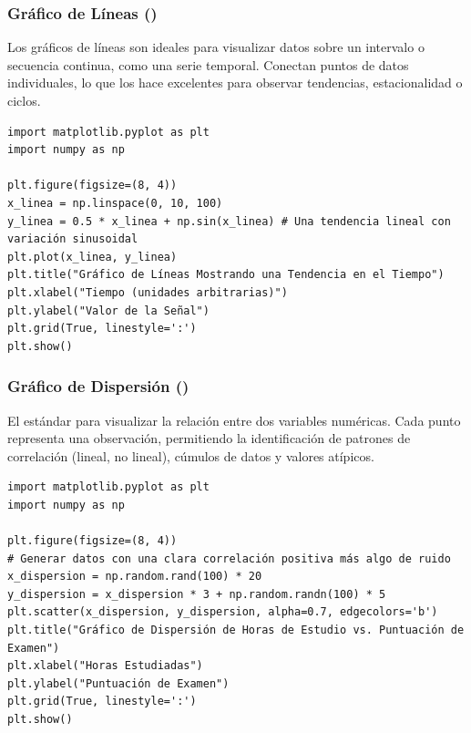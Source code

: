 \subsubsection*{Gráfico de Líneas ()}
Los gráficos de líneas son ideales para visualizar datos sobre un intervalo o secuencia continua, como una serie temporal. Conectan puntos de datos individuales, lo que los hace excelentes para observar tendencias, estacionalidad o ciclos.

\begin{example}
\text{ }\begin{verbatim}
import matplotlib.pyplot as plt
import numpy as np

plt.figure(figsize=(8, 4))
x_linea = np.linspace(0, 10, 100)
y_linea = 0.5 * x_linea + np.sin(x_linea) # Una tendencia lineal con variación sinusoidal
plt.plot(x_linea, y_linea)
plt.title("Gráfico de Líneas Mostrando una Tendencia en el Tiempo")
plt.xlabel("Tiempo (unidades arbitrarias)")
plt.ylabel("Valor de la Señal")
plt.grid(True, linestyle=':')
plt.show()
\end{verbatim}
\end{example}

\subsubsection*{Gráfico de Dispersión ()}
El estándar para visualizar la relación entre dos variables numéricas. Cada punto representa una observación, permitiendo la identificación de patrones de correlación (lineal, no lineal), cúmulos de datos y valores atípicos.

\begin{example}
\text{ }\begin{verbatim}
import matplotlib.pyplot as plt
import numpy as np

plt.figure(figsize=(8, 4))
# Generar datos con una clara correlación positiva más algo de ruido
x_dispersion = np.random.rand(100) * 20
y_dispersion = x_dispersion * 3 + np.random.randn(100) * 5
plt.scatter(x_dispersion, y_dispersion, alpha=0.7, edgecolors='b')
plt.title("Gráfico de Dispersión de Horas de Estudio vs. Puntuación de Examen")
plt.xlabel("Horas Estudiadas")
plt.ylabel("Puntuación de Examen")
plt.grid(True, linestyle=':')
plt.show()
\end{verbatim}
\end{example}

